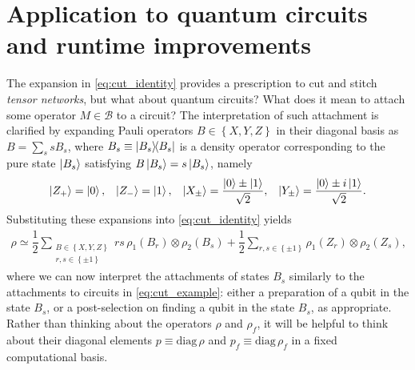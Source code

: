\documentclass[nofootinbib,notitlepage,11pt]{revtex4-2}
\newcommand{\f}[2]{\dfrac{#1}{#2}} %
\newcommand{\p}[1]{\left(#1\right)} %
\renewcommand{\set}[1]{\left\{#1\right\}} %
\newcommand{\B}{\mathcal{B}}
\newcommand{\diag}{\mathrm{diag}\,}
\begin{document}
\section{Application to quantum circuits and runtime improvements}
\label{sec:circuits}

The expansion in \eqref{eq:cut_identity} provides a prescription to
cut and stitch {\it tensor networks}, but what about quantum circuits?
What does it mean to attach some operator $M\in\B$ to a circuit?  The
interpretation of such attachment is clarified by expanding Pauli
operators $B\in\set{X,Y,Z}$ in their diagonal basis as
$B=\sum_s s B_s$, where $B_s\equiv\op{B_s}$ is a density operator
corresponding to the pure state $\ket{B_s}$ satisfying
$B\ket{B_s}=s\ket{B_s}$, namely
\begin{align}
  \ket{Z_+} = \ket0, && \ket{Z_-} = \ket1, &&
  \ket{X_\pm} = \f{\ket0 \pm \ket1}{\sqrt2}, &&
  \ket{Y_\pm} = \f{\ket0 \pm i\ket1}{\sqrt2}.
\end{align}
Substituting these expansions into \eqref{eq:cut_identity} yields
\begin{align}
  \rho \simeq \f12 \sum_{\substack{B\in\set{X,Y,Z}\\r,s\in\set{\pm1}}}
  rs\, \rho_1\p{B_r} \otimes \rho_2\p{B_s}
  + \f12 \sum_{r,s\in\set{\pm1}} \rho_1\p{Z_r} \otimes \rho_2\p{Z_s},
  \label{eq:cut_identity_XYZ}
\end{align}
where we can now interpret the attachments of states $B_s$ similarly
to the attachments to circuits in \eqref{eq:cut_example}: either a
preparation of a qubit in the state $B_s$, or a post-selection on
finding a qubit in the state $B_s$, as appropriate.  Rather than
thinking about the operators $\rho$ and $\rho_f$, it will be helpful
to think about their diagonal elements $p\equiv\diag\rho$ and
$p_f\equiv\diag\rho_f$ in a fixed computational basis.
\end{document}
